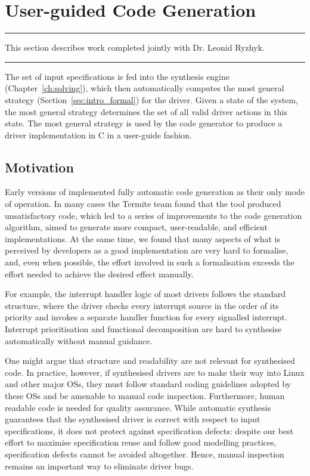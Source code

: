\section{User-guided Code Generation}
\label{s:user-guided}

\hrule
\vspace{10pt}
\begin{center}
This section describes work completed jointly with Dr. Leonid Ryzhyk. 
\end{center}
\hrule
\vspace{20pt}

The set of input \tsl specifications is fed into the \termite synthesis engine (Chapter~\ref{ch:solving}), which then automatically computes the most general strategy (Section~\ref{sec:intro_formal}) for the driver.  Given a state of the system, the most general strategy determines the set of all valid driver actions in this state.  The most general strategy is used by the \termite code generator to produce a driver implementation in C in a user-guide fashion.

\subsection{Motivation}

Early versions of \termite implemented fully automatic code generation as their only mode of operation.  In many cases the Termite team found that the tool produced unsatisfactory code, which led to a series of improvements to the code generation algorithm, aimed to generate more compact, user-readable, and efficient implementations.  At the same time, we found that many aspects of what is perceived by developers as a good implementation are very hard to formalise, and, even when possible, the effort involved in such a formalisation exceeds the effort needed to achieve the desired effect manually.

For example, the interrupt handler logic of most drivers follows the standard structure, where the driver checks every interrupt source in the order of its priority and invokes a separate handler function for every signalled interrupt.  Interrupt prioritisation and functional decomposition are hard to synthesise automatically without manual guidance.

One might argue that structure and readability are not relevant for synthesised code.  In practice, however, if synthesised drivers are to make their way into Linux and other major OSs, they must follow standard coding guidelines adopted by these OSs and be amenable to manual code inspection.  Furthermore, human readable code is needed for quality assurance.  While automatic synthesis guarantees that the synthesised driver is correct with respect to input specifications, it does not protect against specification defects: despite our best effort to maximise specification reuse and follow good modelling practices, specification defects cannot be avoided altogether.  Hence, manual inspection remains an important way to eliminate driver bugs.

